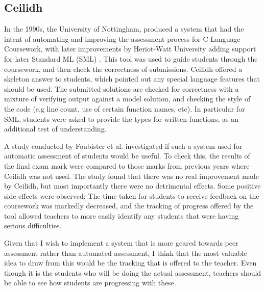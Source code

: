 \documentclass[a4paper,11pt]{report}
\begin{document}
\subsection{Ceilidh}
In the 1990s, the University of Nottingham, produced a system that had the intent of automating and improving the assessment process for C Language Coursework, with later improvements by Heriot-Watt University adding support for later Standard ML (SML) \cite{foubister_automatic_1997}. This tool was used to guide students through the coursework, and then check the correctness of submissions. Ceilidh offered a skeleton answer to students, which pointed out any special language features that should be used. The submitted solutions are checked for correctness with a mixture of verifying output against a model solution, and checking the style of the code (e.g line count, use of certain function names, etc).  In particular for SML, students were asked to provide the types for written functions, as an additional test of understanding.\par
A study conducted by Foubister et al. investigated if such a system used for automatic assessment of students would be useful. To check this, the results of the final exam mark were compared to those marks from previous years where Ceilidh was not used. The study found that there was no real improvement made by Ceilidh, but most importantly there were no detrimental effects. Some positive side effects were observed: The time taken for students to receive feedback on the coursework was markedly decreased, and the tracking of progress offered by the tool allowed teachers to more easily identify any students that were having serious difficulties.\par
Given that I wish to implement a system that is more geared towards peer assessment rather than automated assessment, I think that the most valuable idea to draw from this would be the tracking that is offered to the teacher. Even though it is the students who will be doing the actual assessment, teachers should be able to see how students are progressing with these.
\end{document}
